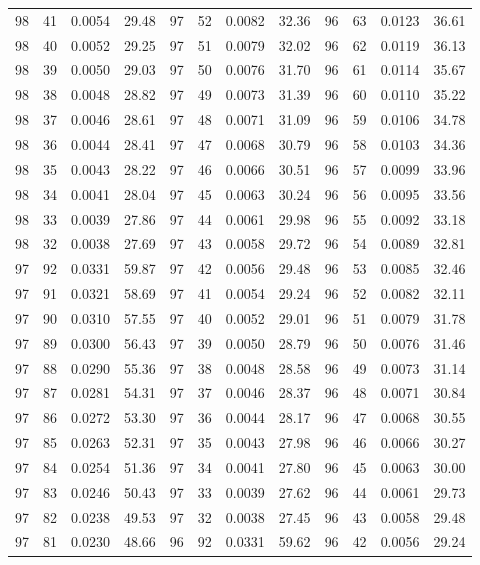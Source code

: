 \begin{tabular}{llll|llll|llll}
98 & 41 & 0.0054 & 29.48 & 97 & 52 & 0.0082 & 32.36 & 96 & 63 & 0.0123 & 36.61\\
98 & 40 & 0.0052 & 29.25 & 97 & 51 & 0.0079 & 32.02 & 96 & 62 & 0.0119 & 36.13\\
98 & 39 & 0.0050 & 29.03 & 97 & 50 & 0.0076 & 31.70 & 96 & 61 & 0.0114 & 35.67\\
98 & 38 & 0.0048 & 28.82 & 97 & 49 & 0.0073 & 31.39 & 96 & 60 & 0.0110 & 35.22\\
98 & 37 & 0.0046 & 28.61 & 97 & 48 & 0.0071 & 31.09 & 96 & 59 & 0.0106 & 34.78\\
98 & 36 & 0.0044 & 28.41 & 97 & 47 & 0.0068 & 30.79 & 96 & 58 & 0.0103 & 34.36\\
98 & 35 & 0.0043 & 28.22 & 97 & 46 & 0.0066 & 30.51 & 96 & 57 & 0.0099 & 33.96\\
98 & 34 & 0.0041 & 28.04 & 97 & 45 & 0.0063 & 30.24 & 96 & 56 & 0.0095 & 33.56\\
98 & 33 & 0.0039 & 27.86 & 97 & 44 & 0.0061 & 29.98 & 96 & 55 & 0.0092 & 33.18\\
98 & 32 & 0.0038 & 27.69 & 97 & 43 & 0.0058 & 29.72 & 96 & 54 & 0.0089 & 32.81\\
97 & 92 & 0.0331 & 59.87 & 97 & 42 & 0.0056 & 29.48 & 96 & 53 & 0.0085 & 32.46\\
97 & 91 & 0.0321 & 58.69 & 97 & 41 & 0.0054 & 29.24 & 96 & 52 & 0.0082 & 32.11\\
97 & 90 & 0.0310 & 57.55 & 97 & 40 & 0.0052 & 29.01 & 96 & 51 & 0.0079 & 31.78\\
97 & 89 & 0.0300 & 56.43 & 97 & 39 & 0.0050 & 28.79 & 96 & 50 & 0.0076 & 31.46\\
97 & 88 & 0.0290 & 55.36 & 97 & 38 & 0.0048 & 28.58 & 96 & 49 & 0.0073 & 31.14\\
97 & 87 & 0.0281 & 54.31 & 97 & 37 & 0.0046 & 28.37 & 96 & 48 & 0.0071 & 30.84\\
97 & 86 & 0.0272 & 53.30 & 97 & 36 & 0.0044 & 28.17 & 96 & 47 & 0.0068 & 30.55\\
97 & 85 & 0.0263 & 52.31 & 97 & 35 & 0.0043 & 27.98 & 96 & 46 & 0.0066 & 30.27\\
97 & 84 & 0.0254 & 51.36 & 97 & 34 & 0.0041 & 27.80 & 96 & 45 & 0.0063 & 30.00\\
97 & 83 & 0.0246 & 50.43 & 97 & 33 & 0.0039 & 27.62 & 96 & 44 & 0.0061 & 29.73\\
97 & 82 & 0.0238 & 49.53 & 97 & 32 & 0.0038 & 27.45 & 96 & 43 & 0.0058 & 29.48\\
97 & 81 & 0.0230 & 48.66 & 96 & 92 & 0.0331 & 59.62 & 96 & 42 & 0.0056 & 29.24\\

\end{tabular}
